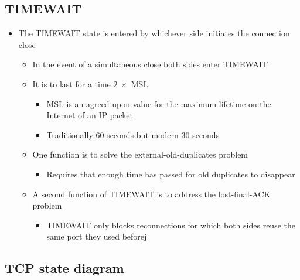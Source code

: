 \documentclass[11pt]{article}
\providecommand{\tightlist}{%
      \setlength{\itemsep}{0pt}\setlength{\parskip}{0pt}}
\begin{document}
    \subsection{TIMEWAIT}\label{timewait}

\begin{itemize}
\tightlist
\item
  The TIMEWAIT state is entered by whichever side initiates the
  connection close

  \begin{itemize}
  \tightlist
  \item
    In the event of a simultaneous close both sides enter TIMEWAIT
  \item
    It is to last for a time \(2 \ \times\) MSL

    \begin{itemize}
    \tightlist
    \item
      MSL is an agreed-upon value for the maximum lifetime on the
      Internet of an IP packet
    \item
      Traditionally 60 seconds but modern 30 seconds
    \end{itemize}
  \item
    One function is to solve the external-old-duplicates problem

    \begin{itemize}
    \tightlist
    \item
      Requires that enough time has passed for old duplicates to
      disappear
    \end{itemize}
  \item
    A second function of TIMEWAIT is to address the lost-final-ACK
    problem

    \begin{itemize}
    \tightlist
    \item
      TIMEWAIT only blocks reconnections for which both sides reuse the
      same port they used beforej
    \end{itemize}
  \end{itemize}
\end{itemize}

    \subsection{TCP state diagram}\label{tcp-state-diagram}
\end{document}
